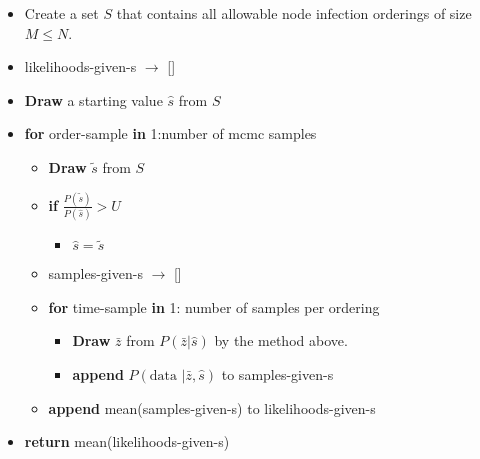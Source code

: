 \documentclass{article}
\begin{document}
\begin{itemize}
\item Create a set $S$ that contains all allowable node infection orderings of 
size $M \le N$.
\item likelihoods-given-s $\rightarrow$ []
\item \textbf{Draw} a starting value $\hat{s}$ from $S$ 
\item \textbf{for} order-sample \textbf{in} 1:number of mcmc samples
\begin{itemize}
\item \textbf{Draw} $\widetilde{s}$ from $S$
\item \textbf{if} $\frac{P(\widetilde{s})}{P(\hat{s})} > U$
\begin{itemize} 
\item $\hat{s} = \widetilde{s}$
\end{itemize}
\item samples-given-s $\rightarrow$ []
\item \textbf{for} time-sample \textbf{in} 1: number of samples per ordering
\begin{itemize}
\item \textbf{Draw} $\bar{z}$ from $P(\bar{z}|\hat{s})$ by the method above.
\item \textbf{append}  $P(\text{data } | \bar{z}, \hat{s})$ to samples-given-s
\end{itemize}
\item \textbf{append} mean(samples-given-s) to likelihoods-given-s
\end{itemize}
\item \textbf{return} mean(likelihoods-given-s)
\end{itemize}
\end{document}
